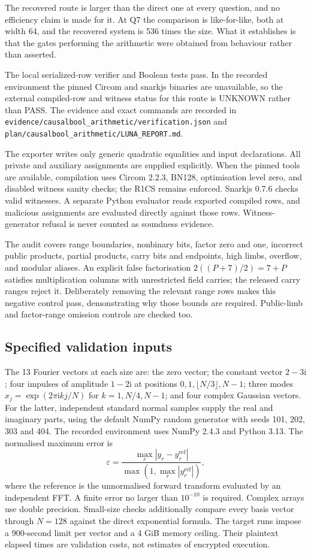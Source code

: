 \documentclass[11pt,a4paper]{article}
\begin{document}
The recovered route is larger than the direct one at every question, and no
efficiency claim is made for it. At Q7 the comparison is like-for-like, both at
width 64, and the recovered system is 536 times the size. What it establishes
is that the gates performing the arithmetic were obtained from behaviour rather
than asserted.

The local serialized-row verifier and Boolean tests pass. In the recorded
environment the pinned Circom and snarkjs binaries are unavailable, so the
external compiled-row and witness status for this route is UNKNOWN rather
than PASS. The evidence and exact commands are recorded in
\texttt{evidence/causalbool\_arithmetic/verification.json} and
\texttt{plan/causalbool\_arithmetic/LUNA\_REPORT.md}.

The exporter writes only generic quadratic equalities and input declarations.
All private and auxiliary assignments are supplied explicitly. When the pinned
tools are available, compilation uses Circom 2.2.3, BN128, optimisation level
zero, and disabled witness sanity checks;
the R1CS remains enforced. Snarkjs 0.7.6 checks valid witnesses. A separate
Python evaluator reads exported compiled rows, and malicious assignments are
evaluated directly against those rows. Witness-generator refusal is never
counted as soundness evidence.

The audit covers range boundaries, nonbinary bits, factor zero and one,
incorrect public products, partial products, carry bits and endpoints, high
limbs, overflow, and modular aliases. An explicit false factorisation
$2((P+7)/2)=7+P$ satisfies multiplication columns with unrestricted field
carries; the released carry ranges reject it. Deliberately removing the relevant
range rows makes this negative control pass, demonstrating why those bounds
are required. Public-limb and factor-range omission controls are checked too.

\subsection{Specified validation inputs}
The 13 Fourier vectors at each size are: the zero vector; the constant
vector $2-3\mathrm{i}$; four impulses of amplitude $1-2\mathrm{i}$ at
positions $0,1,\lfloor N/3\rfloor,N-1$; three modes
$x_j=\exp(2\pi\mathrm{i}kj/N)$ for $k=1,N/4,N-1$; and four complex Gaussian
vectors. For the latter, independent standard normal samples supply the
real and imaginary parts, using the default NumPy random generator with
seeds 101, 202, 303 and 404. The recorded environment uses NumPy 2.4.3 and
Python 3.13. The normalised maximum error is
\[
\varepsilon=\frac{\max_r|y_r-y_r^{\mathrm{ref}}|}
 {\max(1,\max_r|y_r^{\mathrm{ref}}|)},
\]
where the reference is the unnormalised forward transform evaluated by an
independent FFT. A finite error no larger than $10^{-10}$ is required.
Complex arrays use double precision. Small-size checks additionally compare
every basis vector through $N=128$ against the direct exponential formula.
The target runs impose a 900-second limit per vector and a 4 GiB memory
ceiling. Their plaintext elapsed times are validation costs, not estimates
of encrypted execution.
\end{document}
